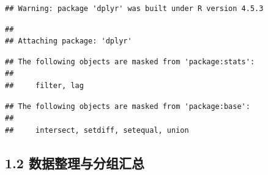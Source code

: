 \documentclass[
]{article}
\newenvironment{Shaded}{\begin{snugshade}}{\end{snugshade}}
\newcommand{\AttributeTok}[1]{\textcolor[rgb]{0.13,0.29,0.53}{#1}}
\newcommand{\FunctionTok}[1]{\textcolor[rgb]{0.13,0.29,0.53}{\textbf{#1}}}
\newcommand{\NormalTok}[1]{#1}
\newcommand{\OtherTok}[1]{\textcolor[rgb]{0.56,0.35,0.01}{#1}}
\newcommand{\SpecialCharTok}[1]{\textcolor[rgb]{0.81,0.36,0.00}{\textbf{#1}}}
\newcommand{\StringTok}[1]{\textcolor[rgb]{0.31,0.60,0.02}{#1}}
\begin{document}
\begin{verbatim}
## Warning: package 'dplyr' was built under R version 4.5.3
\end{verbatim}

\begin{verbatim}
## 
## Attaching package: 'dplyr'
\end{verbatim}

\begin{verbatim}
## The following objects are masked from 'package:stats':
## 
##     filter, lag
\end{verbatim}

\begin{verbatim}
## The following objects are masked from 'package:base':
## 
##     intersect, setdiff, setequal, union
\end{verbatim}

\begin{Shaded}
\end{Shaded}

\subsection{1.2
数据整理与分组汇总}\label{ux6570ux636eux6574ux7406ux4e0eux5206ux7ec4ux6c47ux603b}
\end{document}
